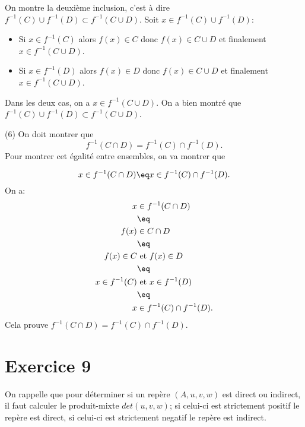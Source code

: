 \documentclass[12pt, a4paper,oneside]{article} %
\begin{document}
On montre la deuxième inclusion,
c'est à dire
$ 
f^{-1} (C) \cup f^{-1}(D)
\subset
f^{-1} (C \cup D)
$.
Soit $ x \in
f^{-1} (C) \cup f^{-1}(D)
$:
\begin{itemize}
	\item 
		Si $ x \in f^{-1} (C) $
		alors $ f(x) \in C $
		donc $ f(x) \in C \cup D $
		et finalement
		$ x \in f^{-1} (C \cup D) $.
	\item 
		Si $ x \in f^{-1} (D) $
		alors $ f(x) \in D $
		donc $ f(x) \in C \cup D $
		et finalement
		$ x \in f^{-1} (C \cup D) $.
\end{itemize}
Dans les deux cas,
on a 
$ x \in f^{-1} (C \cup D) $.
On a bien montré que
$ 
f^{-1} (C) \cup f^{-1}(D)
\subset
f^{-1} (C \cup D)
$.

(6) On doit montrer que
\begin{equation}
	f^{-1} ( C \cap D )
	=
	f^{-1} (C)
	\cap
	f^{-1} (D)
	.
\end{equation}
Pour montrer cet égalité entre ensembles,
on va montrer que

\begin{equation}
	x \in
	f^{-1} ( C \cap D )
	\eq
	x \in
	f^{-1} (C)
	\cap
	f^{-1} (D)
	.
\end{equation}
On a:
\begin{align}
	x
	& \in
	f^{-1} ( C \cap D )
	\\
	& \eq
	\\
	f(x)
	& \in
	C \cap D
	\\
	& \eq
	\\
	f(x)
	\in
	C
	& \text{ et }
	f(x)
	\in
	D
	\\
	& \eq
	\\
	x
	\in
	f^{-1} (C)
	& \text{ et }
	x
	\in
	f^{-1} (D)
	\\
	& \eq
	\\
	x
	& \in
	f^{-1} (C)
	\cap
	f^{-1} (D)
	.
\end{align}
Cela prouve
$ 
f^{-1} ( C \cap D )
=
f^{-1} (C)
\cap
f^{-1} (D)
$.

\section{Exercice 9}

On rappelle que pour
déterminer si un repère
$ (A, u, v, w) $
est direct
ou indirect,
il faut calculer
le produit-mixte
$ det(u, v, w) $;
si celui-ci est strictement
positif le repère est direct,
si celui-ci est strictement
negatif le repère est indirect.
\end{document}
